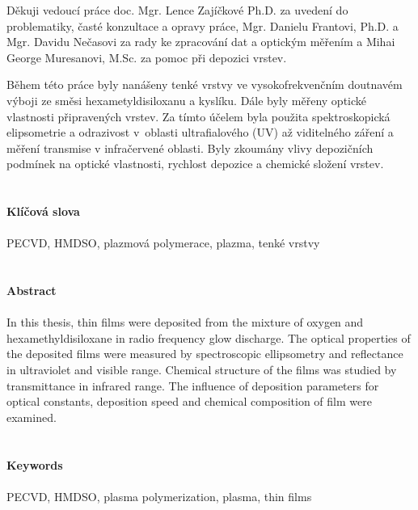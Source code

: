 \documentclass[12pt,oneside,final]{fithesis2}
\begin{document}
\FrontMatter
\ThesisTitlePage

\begin{ThesisDeclaration}
\DeclarationText
\AdvisorName
\end{ThesisDeclaration}

\begin{ThesisThanks}
Děkuji vedoucí práce doc. Mgr. Lence Zajíčkové Ph.D. za uvedení do problematiky, časté konzultace a opravy práce, Mgr. Danielu Frantovi, Ph.D. a Mgr. Davidu Nečasovi za rady ke zpracování dat a optickým měřením a Mihai George Muresanovi, M.Sc. za pomoc při depozici vrstev.
\end{ThesisThanks}

\begin{ThesisAbstract}
Během této práce byly nanášeny tenké vrstvy ve vysokofrekvenčním doutnavém výboji ze směsi hexametyldisiloxanu a kyslíku. Dále byly měřeny optické vlastnosti připravených vrstev. Za tímto účelem byla použita spektroskopická elipsometrie a odrazivost v~oblasti ultrafialového (UV) až viditelného záření a měření transmise v infračervené oblasti. Byly zkoumány vlivy depozičních podmínek na optické vlastnosti, rychlost depozice a chemické složení vrstev.
\\
\\
\\
{\large \bf Klíčová slova}
\\
\\
PECVD, HMDSO, plazmová polymerace, plazma, tenké vrstvy
\\
\\
\\
{\Large \bf Abstract}
\\
\\
In this thesis, thin films were deposited from the mixture of oxygen and hexamethyldisiloxane in radio frequency glow discharge. The optical properties of the deposited films were measured by spectroscopic ellipsometry and reflectance in ultraviolet and visible range. Chemical structure of the films was studied by transmittance in infrared range. The influence of deposition parameters for optical constants, deposition speed and chemical composition of film were examined. 
\\
\\
\\
{\large \bf Keywords}
\\
\\
PECVD, HMDSO, plasma polymerization, plasma, thin films

\end{ThesisAbstract}
\end{document}
